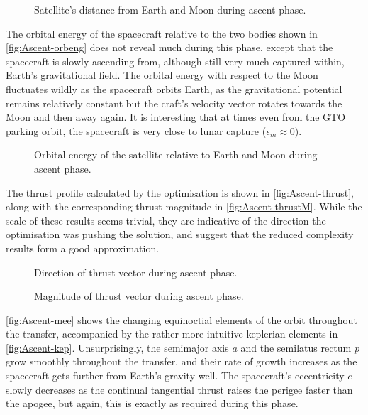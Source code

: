 \begin{figure}
\centering
\def\svgwidth{\figurewidth}

\caption{Satellite's distance from Earth and Moon during ascent phase.}
\label{fig:Ascent-dist}
\end{figure}

The orbital energy of the spacecraft relative to the two bodies shown in \autoref{fig:Ascent-orbeng} does not reveal much during this phase, except that the spacecraft is slowly ascending from, although still very much captured within, Earth's gravitational field. The orbital energy with respect to the Moon fluctuates wildly as the spacecraft orbits Earth, as the gravitational potential remains relatively constant but the craft's velocity vector rotates towards the Moon and then away again. It is interesting that at times even from the GTO parking orbit, the spacecraft is very close to lunar capture ($\epsilon_m\approx0$).

\begin{figure}
\centering
\def\svgwidth{\figurewidth}

\caption{Orbital energy of the satellite relative to Earth and Moon during ascent phase.}
\label{fig:Ascent-orbeng}
\end{figure}

The thrust profile calculated by the optimisation is shown in \autoref{fig:Ascent-thrust}, along with the corresponding thrust magnitude in \autoref{fig:Ascent-thrustM}. While the scale of these results seems trivial, they are indicative of the direction the optimisation was pushing the solution, and suggest that the reduced complexity results form a good approximation. 

\begin{figure}
\centering
\def\svgwidth{\figurewidth}

\caption{Direction of thrust vector during ascent phase.}
\label{fig:Ascent-thrust}
\end{figure}

\begin{figure}
\centering
\def\svgwidth{\figurewidth}

\caption{Magnitude of thrust vector during ascent phase.}
\label{fig:Ascent-thrustM}
\end{figure}

\autoref{fig:Ascent-mee} shows the changing equinoctial elements of the orbit throughout the transfer, accompanied by the rather more intuitive keplerian elements in \autoref{fig:Ascent-kep}. Unsurprisingly, the semimajor axis $a$ and the semilatus rectum $p$ grow smoothly throughout the transfer, and their rate of growth increases as the spacecraft gets further from Earth's gravity well. The spacecraft's eccentricity $e$ slowly decreases as the continual tangential thrust raises the perigee faster than the apogee, but again, this is exactly as required during this phase.

